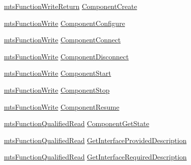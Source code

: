 \begin{DoxyCompactItemize}
\item 
\hyperlink{classmts_function_write_return}{mts\-Function\-Write\-Return} \hyperlink{structmts_manager_component_server_1_1_interface_g_c_m_function_type_abb1e9f78964501f4da69c03de37f4838}{Component\-Create}
\item 
\hyperlink{classmts_function_write}{mts\-Function\-Write} \hyperlink{structmts_manager_component_server_1_1_interface_g_c_m_function_type_a85219d262bbbed632ce7162b09a4d395}{Component\-Configure}
\item 
\hyperlink{classmts_function_write}{mts\-Function\-Write} \hyperlink{structmts_manager_component_server_1_1_interface_g_c_m_function_type_a0195cc5b292cc3678ca36472ea13f17b}{Component\-Connect}
\item 
\hyperlink{classmts_function_write}{mts\-Function\-Write} \hyperlink{structmts_manager_component_server_1_1_interface_g_c_m_function_type_a35e1f1e79cb7512330b5c4bfaf3973ca}{Component\-Disconnect}
\item 
\hyperlink{classmts_function_write}{mts\-Function\-Write} \hyperlink{structmts_manager_component_server_1_1_interface_g_c_m_function_type_a4b94dcd9b220436a6dc09785a03d2f62}{Component\-Start}
\item 
\hyperlink{classmts_function_write}{mts\-Function\-Write} \hyperlink{structmts_manager_component_server_1_1_interface_g_c_m_function_type_acb5efe8ccde82db9df861a278611f775}{Component\-Stop}
\item 
\hyperlink{classmts_function_write}{mts\-Function\-Write} \hyperlink{structmts_manager_component_server_1_1_interface_g_c_m_function_type_a31c3278e2382391cb94e9ee12ad1083b}{Component\-Resume}
\item 
\hyperlink{classmts_function_qualified_read}{mts\-Function\-Qualified\-Read} \hyperlink{structmts_manager_component_server_1_1_interface_g_c_m_function_type_ace36e00d02793bf5cc39208b58a3fc6a}{Component\-Get\-State}
\item 
\hyperlink{classmts_function_qualified_read}{mts\-Function\-Qualified\-Read} \hyperlink{structmts_manager_component_server_1_1_interface_g_c_m_function_type_a8b4a13383c4cbac030962039eed7f91c}{Get\-Interface\-Provided\-Description}
\item 
\hyperlink{classmts_function_qualified_read}{mts\-Function\-Qualified\-Read} \hyperlink{structmts_manager_component_server_1_1_interface_g_c_m_function_type_a0c3fdc2d9ba37daef5c022918fbf4ead}{Get\-Interface\-Required\-Description}
\item 

\end{DoxyCompactItemize}

